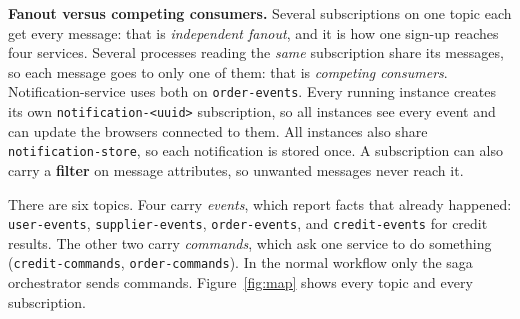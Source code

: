 \documentclass[11pt,a4paper]{article}
\newcommand{\code}[1]{\nolinkurl{#1}}
\begin{document}
\textbf{Fanout versus competing consumers.} Several subscriptions on one topic each get every
message: that is \emph{independent fanout}, and it is how one sign-up reaches four services.
Several processes reading the \emph{same} subscription share its messages, so each message goes
to only one of them: that is \emph{competing consumers}. Notification-service uses both on
\code{order-events}. Every running instance creates its own \code{notification-<uuid>} subscription,
so all instances see every event and can update the browsers connected to them. All instances also
share \code{notification-store}, so each notification is stored once. A subscription can also carry
a \textbf{filter} on message attributes, so unwanted messages never reach it.

There are six topics. Four carry \emph{events}, which report facts that already happened:
\code{user-events}, \code{supplier-events}, \code{order-events}, and \code{credit-events} for
credit results. The other two carry \emph{commands}, which ask one service to do something
(\code{credit-commands}, \code{order-commands}). In the normal workflow only the saga orchestrator
sends commands. Figure~\ref{fig:map} shows every topic and every subscription.
\end{document}
